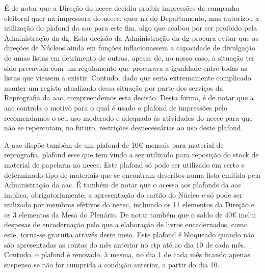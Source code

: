 É de notar que a Direção do \acrshort{neeec} decidiu proibir impressões da campanha eleitoral quer na impressora do \acrshort{neeec}, quer na do Departamento, mas autorizou a utilização do plafond da \acrshort{aac} para este fim, algo que acabou por ser proibido pela Administração da \acrshort{dg}. Esta decisão da Administração da \acrshort{dg} procura evitar que as direções de Núcleos ainda em funções inflacionassem a capacidade de divulgação de umas listas em detrimento de outras, apesar de, no nosso caso, a situação ter sido precavida com um regulamento que procurava a igualdade entre todas as listas que viessem a existir. Contudo, dado que seria extremamente complicado manter um registo atualizado dessa situação por parte dos serviços da Reprografia da \acrshort{aac}, compreendemos esta decisão. Desta forma, é de notar que a \acrshort{aac} controla o motivo para o qual é usado o plafond de impressões pelo recomendamos o seu uso moderado e adequado às atividades do \acrshort{neeec} para que não se repercutam, no futuro, restrições desnecessárias ao uso deste plafond.

A \acrshort{aac} dispõe também de um plafond de 10€ mensais para material de reprografia, plafond esse que tem vindo a ser utilizado para reposição do stock de material de papelaria no \acrshort{neeec}. Este plafond só pode ser utilizado em certo e determinado tipo de materiais que se encontram descritos numa lista emitida pela Administração da \acrshort{aac}. É também de notar que o acesso aos plafonds da \acrshort{aac} implica, obrigatoriamente, a apresentação do cartão do Núcleo e só pode ser utilizado por membros efetivos do \acrshort{neeec}, incluindo os 11 elementos da Direção e os 3 elementos da Mesa do Plenário. De notar também que o saldo de 40€ inclui despesas de encadernação pelo que a elaboração de livros encadernados, como este, torna-se gratuita através deste meio. Este plafond é bloqueado quando não são apresentadas as contas do mês anterior no \acrshort{ctp} até ao dia 10 de cada mês. Contudo, o plafond é renovado, à mesma, no dia 1 de cada mês ficando apenas suspenso se não for cumprida a condição anterior, a partir do dia 10.
